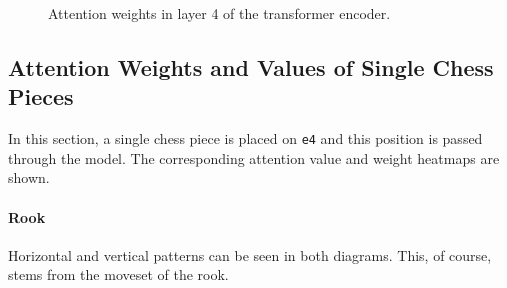\begin{figure}[H]
\begin{minipage}{0.475\textwidth}
    \caption{Attention weights in layer 4 of the transformer encoder.}
    \label{atnP1}
  \end{minipage}
\end{figure}

\subsection{Attention Weights and Values of Single Chess Pieces}\label{mlS32}

In this section, a single chess piece is placed on \texttt{e4} and this
position is passed through the model. The corresponding attention value and
weight heatmaps are shown.

\paragraph{Rook} Horizontal and vertical patterns can be seen in both diagrams.
This, of course, stems from the moveset of the rook.

